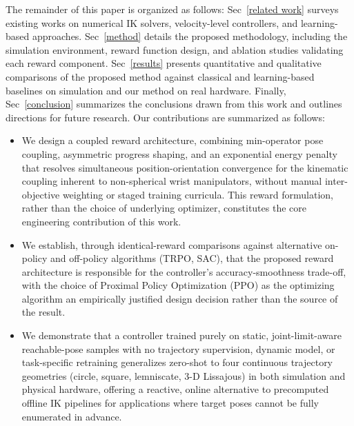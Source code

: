 \documentclass[preprint,12pt]{elsarticle}
\begin{document}
The remainder of this paper is organized as follows: Sec~\ref{related work} surveys existing works on numerical IK solvers, velocity-level controllers, and learning-based approaches. Sec~\ref{method} details the proposed methodology, including the simulation environment, reward function design, and ablation studies validating each reward component. Sec~\ref{results} presents quantitative and qualitative comparisons of the proposed method against classical and learning-based baselines on simulation and our method on real hardware. Finally, Sec~\ref{conclusion} summarizes the conclusions drawn from this work and outlines directions for future research. Our contributions are summarized as follows:
\begin{itemize}
\item We design a coupled reward architecture, combining min-operator
pose coupling, asymmetric progress shaping, and an exponential energy
penalty that resolves simultaneous position-orientation convergence
for the kinematic coupling inherent to non-spherical wrist manipulators,
without manual inter-objective weighting or staged training curricula.
This reward formulation, rather than the choice of underlying optimizer,
constitutes the core engineering contribution of this work.

\item We establish, through identical-reward comparisons against
alternative on-policy and off-policy algorithms (TRPO, SAC), that the
proposed reward architecture is responsible for the controller's
accuracy-smoothness trade-off, with the choice of Proximal Policy
Optimization (PPO) as the optimizing algorithm an empirically justified
design decision rather than the source of the result.

\item We demonstrate that a controller trained purely on static,
joint-limit-aware reachable-pose samples with no trajectory
supervision, dynamic model, or task-specific retraining generalizes
zero-shot to four continuous trajectory geometries (circle, square,
lemniscate, 3-D Lissajous) in both simulation and physical hardware,
offering a reactive, online alternative to precomputed offline IK
pipelines for applications where target poses cannot be fully enumerated
in advance.
\end{itemize}
\end{document}
